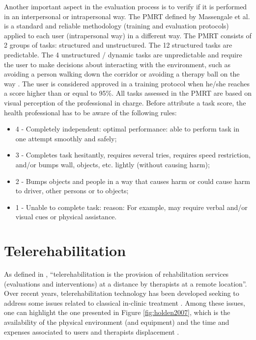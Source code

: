 Another important aspect in the evaluation process is to verify if it is performed in an interpersonal or intrapersonal way. The PMRT defined by Massengale et al. \cite{massengale2005} is a standard and reliable methodology (training and evaluation protocols) applied to each user (intrapersonal way) in a different way. The PMRT consists of 2 groups of tasks: structured and unstructured. The 12 structured tasks are predictable. The 4 unstructured / dynamic tasks are unpredictable and require the user to make decisions about interacting with the environment, such as avoiding a person walking down the corridor or avoiding a therapy ball on the way \cite{massengale2005}. The user is considered approved in a training protocol when he/she reaches a score higher than or equal to 95\%. All tasks assessed in the PMRT are based on visual perception of the professional in charge. Before attribute a task score, the health professional has to be aware of the following rules:
\begin{itemize}
\item 4 -  Completely independent: optimal performance: able to perform task in one attempt smoothly and safely;
\item 3 - Completes task hesitantly, requires several tries, requires speed restriction, and/or bumps wall, objects, etc. lightly (without causing harm);
\item 2 - Bumps objects and people in a way that causes harm or could cause harm to driver, other persons or to objects;
\item 1 - Unable to complete task: reason:  For example, may require verbal and/or visual cues or physical assistance.
\end{itemize} 

\section{Telerehabilitation}
\label{sec:telerehabilitation}

As defined in \cite{deutsch2007}, ``telerehabilitation is the provision of rehabilitation services (evaluations and interventions) at a distance by therapists at a remote location''. Over recent years, telerehabilitation technology has been developed seeking to address some issues related to classical in-clinic treatment \cite{pani2014,postolache2011}. Among these issues, one can highlight the one presented in Figure \ref{fig:holden2007}, which is the availability of the physical environment (and equipment) and the time and expenses associated to users and therapists displacement \cite{brennan2011,holden2007,dhurjaty2004}.

